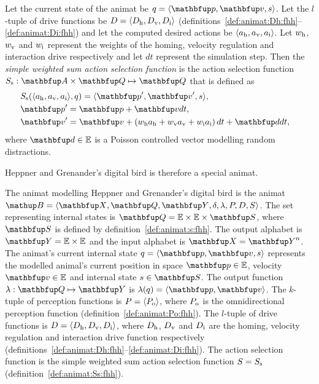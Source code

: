 \begin{definition}
\label{def:animat:Ss:fhh}
Let the current state of the animat be $q=\langle\vect{p},\vect{v},s\rangle$. Let the $l$-tuple of drive functions be $D=\langle D_\textnormal{h}, D_\textnormal{v}, D_\textnormal{i}\rangle$ (definitions~\ref{def:animat:Dh:fhh}--\ref{def:animat:Di:fhh}) and let the computed desired actions be $\langle a_\textnormal{h},a_\textnormal{v},a_\textnormal{i}\rangle$. Let $w_\textnormal{h}$, $w_\textnormal{v}$ and $w_\textnormal{i}$ represent the weights of the homing, velocity regulation and interaction drive respectively and let $dt$ represent the simulation step. Then the \emph{simple weighted sum action selection function} is the action selection function $S_\textnormal{s}: \set{A} \times \set{Q} \mapsto \set{Q}$ that is defined as
\begin{eqnarray}
& S_\textnormal{s}(\langle a_\textnormal{h},a_\textnormal{v},a_\textnormal{i}\rangle, q) = \langle\vect{p}', \vect{v}', s\rangle, & \label{eq:animat:Ss0:fhh} \\
& \vect{p}' = \vect{p} + \vect{v}dt, & \\
& \vect{v}' = \vect{v} + \left(w_\textnormal{h}a_\textnormal{h} + w_\textnormal{v}a_\textnormal{v} + w_\textnormal{i}a_\textnormal{i}\right)dt + \vect{d}dt, & \label{eq:animat:Ss2:fhh} 
\end{eqnarray}
where $\vect{d} \in \E$ is a Poisson controlled vector modelling random distractions.
\end{definition}

Heppner and Grenander's digital bird \cite{heppner:1990} is therefore a special animat.

\begin{definition}
\label{def:animat:fhh}
The animat modelling Heppner and Grenander's digital bird is the animat $\autom{B}=\langle\set{X},\set{Q},\set{Y},\delta,\lambda,P,D,S\rangle$. The set representing internal states is $\set{Q}=\E \times \E \times \set{S}$, where $\set{S}$ is defined by definition~\ref{def:animat:s:fhh}. The output alphabet is $\set{Y}=\E \times \E$ and the input alphabet is $\set{X}=\set{Y}^n$. The animat's current internal state $q=\langle\vect{p},\vect{v},s\rangle$ represents the modelled animal's current position in space $\vect{p} \in \E$, velocity $\vect{v} \in \E$ and internal state $s \in \set{S}$. The output function $\lambda: \set{Q} \mapsto \set{Y}$ is $\lambda(q)=\langle\vect{p},\vect{v}\rangle$. The $k$-tuple of perception functions is $P=\langle P_\textnormal{o}\rangle$, where $P_\textnormal{o}$ is the omnidirectional perception function (definition~\ref{def:animat:Po:fhh}). The $l$-tuple of drive functions is $D=\langle D_\textnormal{h},D_\textnormal{v},D_\textnormal{i}\rangle$, where $D_\textnormal{h}$, $D_\textnormal{v}$ and $D_\textnormal{i}$ are the homing, velocity regulation and interaction drive function respectively (definitions~\ref{def:animat:Dh:fhh}--\ref{def:animat:Di:fhh}). The action selection function is the simple weighted sum action selection function $S=S_\textnormal{s}$ (definition~\ref{def:animat:Ss:fhh}).
\end{definition}
